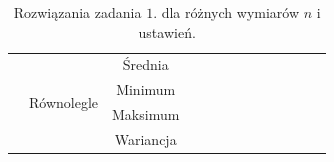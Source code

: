 \documentclass[11pt, a4paper, oneside]{article}
\begin{document}
\begin{table}[h]
\begin{adjustwidth}{-1cm}{}
\begin{tabular}{|c|c|c|l|l|l|l|l|l|l|l|l|l|}
                      & \multirow{4}{*}{Równolegle}   & Średnia   &                          &                         &                          &                         &                          &                         &                          &                         &                          &                         \\ \cline{3-13} 
                      &                               & Minimum   &                          &                         &                          &                         &                          &                         &                          &                         &                          &                         \\ \cline{3-13} 
                      &                               & Maksimum  &                          &                         &                          &                         &                          &                         &                          &                         &                          &                         \\ \cline{3-13} 
                      &                               & Wariancja &                          &                         &                          &                         &                          &                         &                          &                         &                          &                         \\ \hline
\end{tabular}
\end{adjustwidth}
\caption{Rozwiązania zadania $1$. dla różnych wymiarów $n$ i ustawień.}
\label{tab:rozw_zad1}
\end{table}
\end{document}
